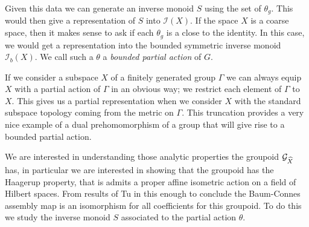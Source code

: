 Given this data we can generate an inverse monoid $S$ using the set of $\theta_{g}$. This would then give a representation of $S$ into $\mathcal{I}(X)$. If the space $X$ is a coarse space, then it makes sense to ask if each $\theta_{g}$ is a close to the identity. In this case, we would get a representation into the bounded symmetric inverse monoid $\mathcal{I}_{b}(X)$. We call such a $\theta$ a \textit{bounded partial action} of $G$.

\begin{example}
If we consider a subspace $X$ of a finitely generated group $\Gamma$ we can always equip $X$ with a partial action of $\Gamma$ in an obvious way; we restrict each element of $\Gamma$ to $X$. This gives us a partial representation when we consider $X$ with the standard subspace topology coming from the metric on $\Gamma$. This truncation provides a very nice example of a dual prehomomorphism of a group that will give rise to a bounded partial action.
\end{example}


We are interested in understanding those analytic properties the groupoid $\mathcal{G}_{\widehat{X}}$ has, in particular we are interested in showing that the groupoid has the Haagerup property, that is admits a proper affine isometric action on a field of Hilbert spaces. From results of Tu in \cite{MR1703305} this enough to conclude the Baum-Connes assembly map is an isomorphism for all coefficients for this groupoid. To do this we study the inverse monoid $S$ associated to the partial action $\theta$.

